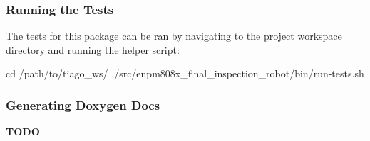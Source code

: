 \subsubsection*{Running the Tests}

The tests for this package can be ran by navigating to the project workspace directory and running the helper script\+: 
\begin{DoxyCode}
cd /path/to/tiago\_ws/
./src/enpm808x\_final\_inspection\_robot/bin/run-tests.sh
\end{DoxyCode}


\subsubsection*{Generating Doxygen Docs}

{\bfseries T\+O\+DO} 